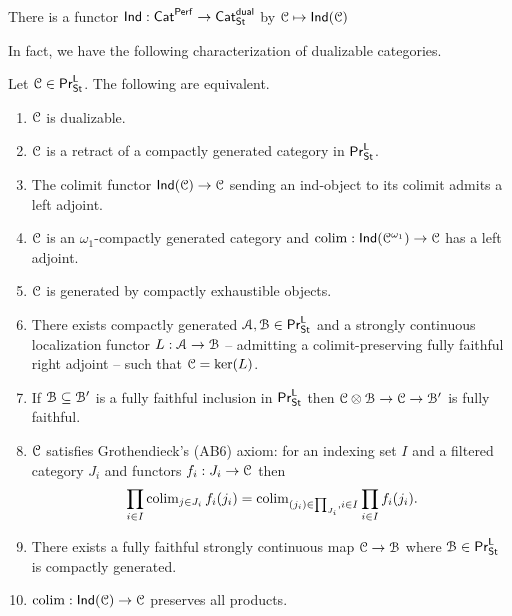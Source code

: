 \begin{example}
    There is a functor $\mathsf{Ind}:\mathsf{Cat}^{\mathsf{Perf}}\to\mathsf{Cat}^{\mathsf{dual}}_{\mathsf{St}}$ by $\EuScript{C}\mapsto\mathsf{Ind}(\EuScript{C})$
\end{example}
In fact, we have the following characterization of dualizable categories. 
\begin{theorem}\label{thm: characterization of dualizable categories}
    Let $\EuScript{C}\in\mathsf{Pr}^{\mathsf{L}}_{\mathsf{St}}$. The following are equivalent. 
    \begin{enumerate}
        \item $\EuScript{C}$ is dualizable. 
        \item $\EuScript{C}$ is a retract of a compactly generated category in $\mathsf{Pr}^{\mathsf{L}}_{\mathsf{St}}$. 
        \item The colimit functor $\mathsf{Ind}(\EuScript{C})\to\EuScript{C}$ sending an ind-object to its colimit admits a left adjoint. 
        \item $\EuScript{C}$ is an $\omega_{1}$-compactly generated category and $\operatorname{colim}:\mathsf{Ind}(\EuScript{C}^{\omega_{1}})\to\EuScript{C}$ has a left adjoint. 
        \item $\EuScript{C}$ is generated by compactly exhaustible objects. 
        \item There exists compactly generated $\EuScript{A},\EuScript{B}\in\mathsf{Pr}^{\mathsf{L}}_{\mathsf{St}}$ and a strongly continuous localization functor $L:\EuScript{A}\to\EuScript{B}$ -- admitting a colimit-preserving fully faithful right adjoint -- such that $\EuScript{C}=\ker(L)$. 
        \item If $\EuScript{B}\subseteq\EuScript{B}'$ is a fully faithful inclusion in $\mathsf{Pr}^{\mathsf{L}}_{\mathsf{St}}$ then $\EuScript{C}\otimes\EuScript{B}\to\EuScript{C}\to\EuScript{B}'$ is fully faithful.
        \item $\EuScript{C}$ satisfies Grothendieck's (AB6) axiom: for an indexing set $I$ and a filtered category $J_{i}$ and functors $f_{i}:J_{i}\to\EuScript{C}$ then 
        $$\prod_{i\in I}\operatorname{colim}_{j\in J_{i}}f_{i}(j_{i})=\operatorname{colim}_{(j_{i})\in\prod_{J_{i}},i\in I}\prod_{i\in I}f_{i}(j_{i}).$$
        \item There exists a fully faithful strongly continuous map $\EuScript{C}\to\EuScript{B}$ where $\EuScript{B}\in\mathsf{Pr}^{\mathsf{L}}_{\mathsf{St}}$ is compactly generated. 
        \item $\operatorname{colim}:\mathsf{Ind}(\EuScript{C})\to\EuScript{C}$ preserves all products. 
    \end{enumerate}
\end{theorem}
